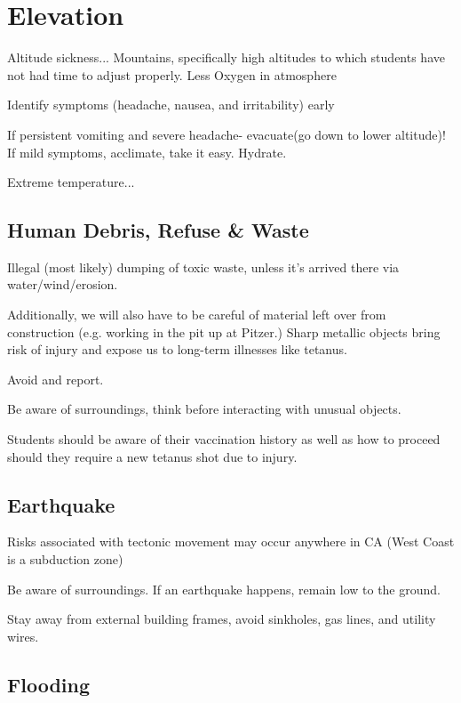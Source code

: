 \documentclass[12pt]{../SOP2}
\begin{document}
\section{Elevation}

\NP Altitude sickness... Mountains, specifically high altitudes to which students have not had time to adjust properly. Less Oxygen in atmosphere

\NP Identify symptoms (headache, nausea, and irritability) early

\NP If persistent vomiting and severe headache- evacuate(go down to lower altitude)! If mild symptoms, acclimate, take it easy. Hydrate.

\NP Extreme temperature...

\NP 

\NP 

\subsection{Human Debris, Refuse \& Waste}

Illegal (most likely) dumping of toxic waste, unless it’s arrived there via water/wind/erosion.


\NP Additionally, we will also have to be careful of material left over from construction (e.g. working in the pit up at Pitzer.) Sharp metallic objects bring risk of injury and expose us to long-term illnesses like tetanus.

\NP Avoid and report.

\NP Be aware of surroundings, think before interacting with unusual objects.

\NP Students should be aware of their vaccination history as well as how to proceed should they require a new tetanus shot due to injury.

\subsection{Earthquake}

\NP Risks associated with tectonic movement may occur anywhere in CA (West Coast is a subduction zone)

\NP Be aware of surroundings. If an earthquake happens, remain low to the ground.

\NP Stay away from external building frames, avoid sinkholes, gas lines, and utility wires.

\subsection{Flooding}
\end{document}
